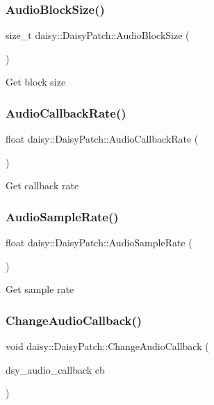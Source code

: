 \subsubsection{\texorpdfstring{Audio\+Block\+Size()}{AudioBlockSize()}}
{\footnotesize\ttfamily size\+\_\+t daisy\+::\+Daisy\+Patch\+::\+Audio\+Block\+Size (\begin{DoxyParamCaption}{ }\end{DoxyParamCaption})}

Get block size \mbox{\label{classdaisy_1_1_daisy_patch_a52112189562e5160b0d7e7157bbbac8a}} 
\subsubsection{\texorpdfstring{Audio\+Callback\+Rate()}{AudioCallbackRate()}}
{\footnotesize\ttfamily float daisy\+::\+Daisy\+Patch\+::\+Audio\+Callback\+Rate (\begin{DoxyParamCaption}{ }\end{DoxyParamCaption})}

Get callback rate \mbox{\label{classdaisy_1_1_daisy_patch_a37a674649bef92a97207ed7fbc4f1b80}} 
\subsubsection{\texorpdfstring{Audio\+Sample\+Rate()}{AudioSampleRate()}}
{\footnotesize\ttfamily float daisy\+::\+Daisy\+Patch\+::\+Audio\+Sample\+Rate (\begin{DoxyParamCaption}{ }\end{DoxyParamCaption})}

Get sample rate \mbox{\label{classdaisy_1_1_daisy_patch_a3596104d2f27dfdb5c5fa3852433d4f9}} 
\subsubsection{\texorpdfstring{Change\+Audio\+Callback()}{ChangeAudioCallback()}}
{\footnotesize\ttfamily void daisy\+::\+Daisy\+Patch\+::\+Change\+Audio\+Callback (\begin{DoxyParamCaption}\item[{dsy\+\_\+audio\+\_\+callback}]{cb }\end{DoxyParamCaption})}

